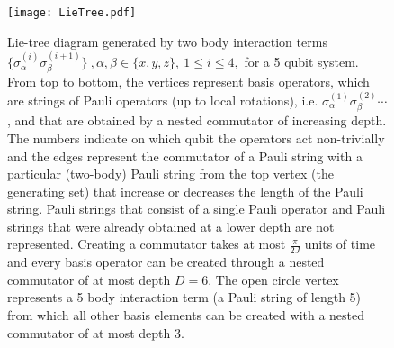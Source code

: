 \documentclass[aps,twocolumn,amsmath,amssymb,nofootinbib,superscriptaddress]{revtex4-1}
\begin{document}
  \begin{figure}
  \texttt{[image: LieTree.pdf]}
 \caption{\label{fig:Lietree} Lie-tree diagram generated by two body interaction terms $\{\sigma_{\alpha}^{(i)}\sigma_{\beta}^{(i+1)}\}~,\alpha,\beta\in\{x,y,z\},~1\leq i\leq 4,$ for a 5 qubit system. From top to bottom, the vertices represent basis operators, which are strings of Pauli operators (up to local rotations), i.e. $\sigma_{\alpha}^{(1)}\sigma_{\beta}^{(2)}\cdots$, and that are obtained by a nested commutator of increasing depth. The numbers indicate on which qubit the operators act non-trivially and the edges represent the commutator of a Pauli string with a particular (two-body) Pauli string from the top vertex (the generating set) that increase or decreases the length of the Pauli string. Pauli strings that consist of a single Pauli operator and Pauli strings that were already obtained at a lower depth are not represented. Creating a commutator takes at most $\frac{\pi}{2J}$ units of time and every basis operator can be created through a nested commutator of at most depth $D=6$. The open circle vertex represents a 5 body interaction term (a Pauli string of length 5) from which all other basis elements can be created with a nested commutator of at most depth 3.}
\end{figure}
\end{document}
